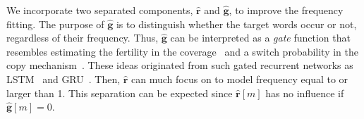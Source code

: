 \documentclass[11pt]{article}
\begin{document}
   We incorporate two separated components, $\hat{\bm{r}}$ and $\hat{\bm{g}}$, to improve the frequency fitting.
The purpose of $\hat{\bm{g}}$ is to distinguish whether the target words occur or not, regardless of their frequency.
Thus, $\hat{\bm g}$ can be interpreted as a {\it gate} function that resembles estimating the fertility in the coverage~\cite{tu-EtAl:2016:P16-1} and a switch probability in the copy mechanism~\cite{gulcehre-EtAl:2016:P16-1}.
These ideas originated from such gated recurrent networks as LSTM~\cite{Hochreiter:1997:LSM:1246443.1246450} and GRU~\cite{DBLP:journals/corr/ChungGCB14}. 
Then, $\hat{\bm{r}}$ can much focus on to model frequency equal to or larger than 1.
This separation can be expected since $\hat{\bm{r}}[m]$ has no influence if $\hat{\bm{g}}[m]\!=\!0$.


   
\end{document}
